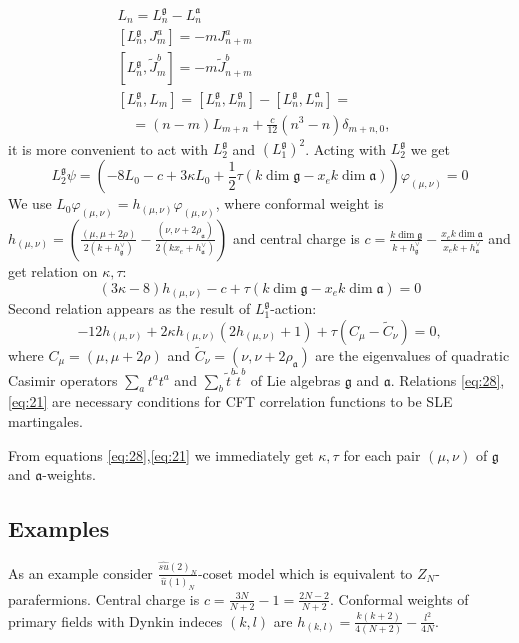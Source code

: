 \documentclass{jetpl}
\newcommand{\gf}{\mathfrak{g}}
\newcommand{\af}{\mathfrak{a}}
\begin{document}
\begin{equation}
  \label{eq:18}
\begin{array}{ll}
  L_{n}= L_{n}^{\gf}-L_{n}^{\af} &\\
  \left[L_{n}^{\gf},J^{a}_{m}\right]= -m J^{a}_{n+m}&\\
  \left[L_{n}^{\gf},\tilde{J}^{b}_{m}\right]=-m\tilde{J}^{b}_{n+m}&\\
  \left[L_{n}^{\gf},L_{m}\right]=[L_{n}^{\gf},L_{m}^{\gf}]-[L_{n}^{\gf},L_{m}^{\af}]=&\\
  \quad =(n-m)L_{m+n}+\frac{c}{12}(n^{3}-n)\delta_{m+n,0},&
\end{array}
\end{equation}
 it is more convenient to act with $L_{2}^{\gf}$ and $\left(L_{1}^{\gf}\right)^{2}$. 
 Acting with $L_{2}^{\gf}$ we get
\begin{equation*}
  L_{2}^{\gf}\psi= \left(-8 L_{0}-c+ 3 \kappa L_{0}+\frac{1}{2}\tau (k \dim\gf-x_{e}k\dim\af)\right) \varphi_{(\mu,\nu)}=0
\end{equation*}
We use $L_{0} \varphi_{(\mu,\nu)}=h_{(\mu,\nu)} \varphi_{(\mu,\nu)}$, where conformal weight is $h_{(\mu,\nu)}= \left(\frac{(\mu,\mu+2\rho)}{2(k+h^{\vee}_{\gf})}-\frac{(\nu,\nu+2\rho_{\af})}{2(k x_{e}+h^{\vee}_{\af})}\right)$ and central charge is $c=\frac{k\dim \gf}{k+h^{\vee}_{\gf}}-\frac{x_{e}k\dim \af}{x_{e} k+h^{\vee}_{\af}}$ and get relation on $\kappa,\tau$:
\begin{equation}
  \label{eq:28} (3\kappa-8)h_{(\mu,\nu)}-c+\tau (k\dim\gf-x_{e}k\dim\af) =0
\end{equation}
Second relation appears as the result of $L_{1}^{\gf}$-action:
\begin{equation}
  \label{eq:21}
 -12 h_{(\mu,\nu)}+2\kappa h_{(\mu,\nu)} (2h_{(\mu,\nu)}+1) + \tau
(C_{\mu}-\tilde{C}_{\nu})=0,
\end{equation}
 where $C_{\mu}=(\mu,\mu+2\rho)$ and $\tilde{C}_{\nu}=(\nu,\nu+2\rho_{\af})$ are the eigenvalues of quadratic Casimir operators $\sum_{a}t^{a}t^{a}$ and $\sum_{b}\tilde{t}^{b}\tilde{t}^{b}$ of Lie algebras $\gf$ and $\af$.
Relations \eqref{eq:28},\eqref{eq:21} are necessary conditions for CFT correlation functions to be SLE martingales. 

From equations \eqref{eq:28},\eqref{eq:21} we immediately get $\kappa,\tau$ for each pair $(\mu,\nu)$ of $\gf$ and $\af$-weights. 

\subsection{Examples}
\label{sec:examples-1}
As an example consider  $\frac{\hat{su}(2)_{N}}{\hat{u}(1)_{N}}$-coset model which is equivalent to $Z_{N}$-parafermions.  Central charge is $c=\frac{3N}{N+2}-1=\frac{2N-2}{N+2}$. Conformal weights of primary fields with Dynkin indeces $(k,l)$ are $h_{(k,l)}=\frac{k(k+2)}{4(N+2)}-\frac{l^{2}}{4N}$.
\end{document}
